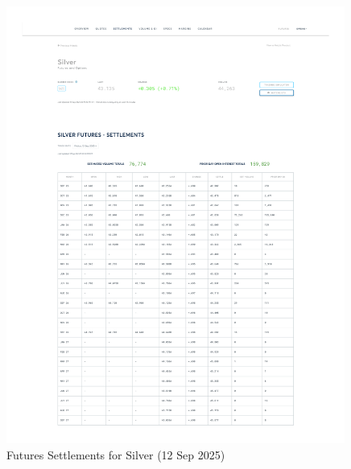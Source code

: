 \documentclass[11pt,a4paper]{article} %
\begin{document}
\begin{figure}[h]
  \centering
  \includegraphics[width=0.99\textwidth]{appendix/SILVER12SEP.pdf}
  \caption{Futures Settlements for Silver (12 Sep 2025)}
  \label{fig:silver_settlements}
\end{figure}
\end{document}
